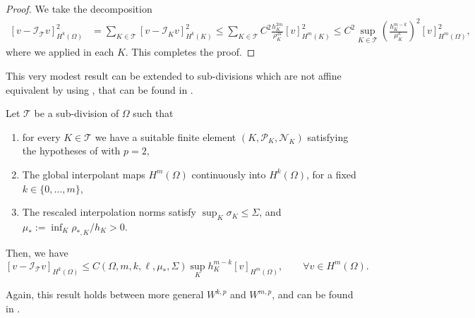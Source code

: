 \begin{proof}
    We take the decomposition
    \begin{align*}
        \left[ v - \mathcal I_{\mathcal T} v \right]_{H^k(\Omega)}^2
         & = \sum_{K \in \mathcal T} \left[ v - \mathcal I_{K} v \right]_{H^k(K)}  ^2
        \le \sum_{K \in \mathcal T} C^2 \frac{h_{K}^{2m}}{\rho_K^{2k}}\left[v \right]_{H^m(K)}    ^2
        \le C^2 \sup_{K \in \mathcal T} \left( \frac{h_{K}^{m-k}}{\mu_K^{k}} \right)^2 \left[v \right]_{H^m(\Omega)}    ^2,
    \end{align*}
    where we applied  in each $K$. This completes the proof.
\end{proof}

This very modest result can be extended to sub-divisions which are not affine equivalent by using , that can be found in \cite{Suli}.
\begin{strongtheorem}
    \label{thm:FEM interpolation error subdivision}
    Let $\mathcal T$ be a sub-division of $\Omega$ such that
    \begin{enumerate}
        \item for every $K \in \mathcal T$ we have a suitable finite element $(K,\mathcal P_K, \mathcal N_K)$ satisfying the hypotheses of  with $p = 2$,
        \item The global interpolant maps $H^m(\Omega)$ continuously into $H^k(\Omega)$, for a fixed $k\in\{0,\dots,m\}$,
        \item The rescaled interpolation norms satisfy $\sup_K\sigma_K\le\Sigma$, and $\mu_*:=\inf_K\rho_{*,K}/h_K>0$.
    \end{enumerate}
    Then, we have
    \begin{equation*}
        \left[v - \mathcal I_{\mathcal T} v \right]_{H^k(\Omega)} \le C\left(\Omega,m,k,\ell,\mu_*,\Sigma\right)  \sup_K{h_{K}^{m-k}}[ v]_{H^m (\Omega)}, \qquad \forall v \in H^m(\Omega).
    \end{equation*}
\end{strongtheorem}

\begin{remark}
    Again, this result holds between more general $W^{k,p}$ and $W^{m,p}$, and can be found in \cite{Suli}.
\end{remark}



